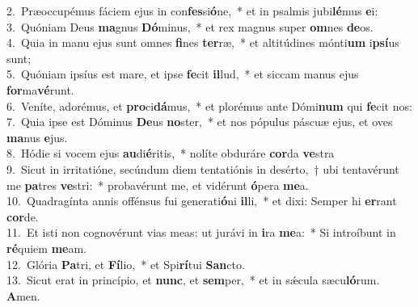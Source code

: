 {2.~}Præoccupémus fáciem ejus in con\textbf{fes}si\textbf{ó}ne,~* et in psalmis jubi\textbf{lé}mus \textbf{e}i:\\
{3.~}Quóniam Deus \textbf{ma}gnus \textbf{Dó}minus,~* et rex magnus super \textbf{om}nes \textbf{de}os.\\
{4.~}Quia in manu ejus sunt omnes \textbf{fi}nes \textbf{ter}ræ,~* et altitúdines mónti\textbf{um} i\textbf{psí}us sunt;\\
{5.~}Quóniam ipsíus est mare, et ipse \textbf{fe}cit \textbf{il}lud,~* et siccam manus ejus \textbf{for}ma\textbf{vé}runt.\\
{6.~}Veníte, adorémus, et \textbf{pro}ci\textbf{dá}mus,~* et plorémus ante Dómi\textbf{num} qui \textbf{fe}cit nos:\\
{7.~}Quia ipse est Dóminus \textbf{De}us \textbf{no}ster,~* et nos pópulus páscuæ ejus, et oves \textbf{ma}nus \textbf{e}jus.\\
{8.~}Hódie si vocem ejus \textbf{au}di\textbf{é}ritis,~* nolíte obduráre \textbf{cor}da \textbf{ve}stra\\
{9.~}Sicut in irritatióne, secúndum diem tentatiónis in desérto,~† ubi tentavérunt me \textbf{pa}tres \textbf{ve}stri:~* probavérunt me, et vidérunt \textbf{ó}pera \textbf{me}a.\\
{10.~}Quadragínta annis offénsus fui generati\textbf{ó}ni \textbf{il}li,~* et dixi: Semper hi \textbf{er}rant \textbf{cor}de.\\
{11.~}Et isti non cognovérunt vias meas: ut jurávi in \textbf{i}ra \textbf{me}a:~* Si introíbunt in \textbf{ré}quiem \textbf{me}am.\\
{12.~}Glória \textbf{Pa}tri, et \textbf{Fí}lio,~* et Spi\textbf{rí}tui \textbf{San}cto.\\
{13.~}Sicut erat in princípio, et \textbf{nunc}, et \textbf{sem}per,~* et in sǽcula sæcu\textbf{ló}rum. \textbf{A}men.\\
